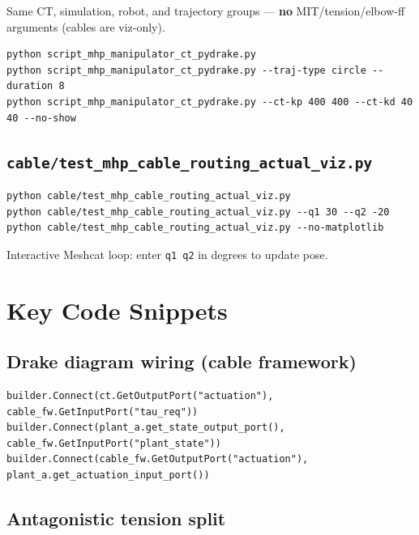 \documentclass[11pt,a4paper]{article}
\begin{document}
Same CT, simulation, robot, and trajectory groups --- \textbf{no} MIT/tension/elbow-ff
arguments (cables are viz-only).

\begin{lstlisting}[style=python, caption={CT-only examples}]
python script_mhp_manipulator_ct_pydrake.py
python script_mhp_manipulator_ct_pydrake.py --traj-type circle --duration 8
python script_mhp_manipulator_ct_pydrake.py --ct-kp 400 400 --ct-kd 40 40 --no-show
\end{lstlisting}

\subsection{\texttt{cable/test\_mhp\_cable\_routing\_actual\_viz.py}}

\begin{lstlisting}[style=python, caption={Cable routing visualization}]
python cable/test_mhp_cable_routing_actual_viz.py
python cable/test_mhp_cable_routing_actual_viz.py --q1 30 --q2 -20
python cable/test_mhp_cable_routing_actual_viz.py --no-matplotlib
\end{lstlisting}

Interactive Meshcat loop: enter \texttt{q1 q2} in degrees to update pose.

\section{Key Code Snippets}

\subsection{Drake diagram wiring (cable framework)}

\begin{lstlisting}[style=python, caption={cable/simulation\_mhp\_cable\_framework.py (connections)}]
builder.Connect(ct.GetOutputPort("actuation"), cable_fw.GetInputPort("tau_req"))
builder.Connect(plant_a.get_state_output_port(), cable_fw.GetInputPort("plant_state"))
builder.Connect(cable_fw.GetOutputPort("actuation"), plant_a.get_actuation_input_port())
\end{lstlisting}

\subsection{Antagonistic tension split}
\end{document}
